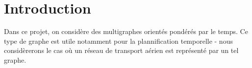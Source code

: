 
\section{Introduction}
\label{sec:introduction}

Dans ce projet, on considère des multigraphes orientés pondérés par le temps. Ce
type de graphe est utile notamment pour la plannification temporelle - nous
considèrerons le cas où un réseau de transport aérien est représenté par un tel
graphe.


